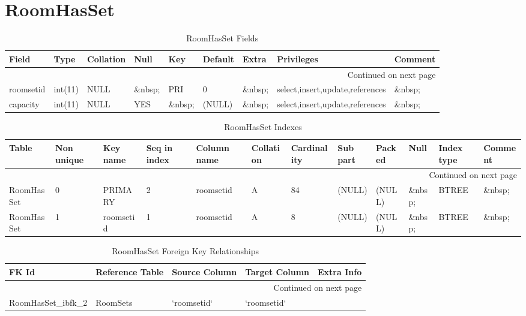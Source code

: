 \documentclass[tablesignature,landscape]{scrartcl}
\begin{document}
\section{RoomHasSet}
\label{sec-21}


\begin{longtable}{|l|l|l|l|l|l|l|l|l|}
\caption{RoomHasSet Fields} \label{tbl:roomhassetfields}\\
\hline
 Field      &  Type     &  Collation  &  Null     &  Key      &  Default  &  Extra    &  Privileges                       &  Comment \\
\hline
\endhead
\hline\multicolumn{9}{r}{Continued on next page}\
\endfoot
\endlastfoot
\hline
 roomid     &  int(11)  &  NULL       &  \&nbsp;  &  PRI      &        0  &  \&nbsp;  &  select,insert,update,references  &  \&nbsp;  \\
 roomsetid  &  int(11)  &  NULL       &  \&nbsp;  &  PRI      &        0  &  \&nbsp;  &  select,insert,update,references  &  \&nbsp;  \\
 capacity   &  int(11)  &  NULL       &  YES      &  \&nbsp;  &   (NULL)  &  \&nbsp;  &  select,insert,update,references  &  \&nbsp;  \\
\hline
\end{longtable}


\begin{longtable}{|l|l|l|l|l|l|l|l|l|l|l|l|}
\caption{RoomHasSet Indexes} \label{tbl:roomhassetindexes}\\
\hline
 Table       &  Non unique  &  Key name   &  Seq in index  &  Column name  &  Collation  &  Cardinality  &  Sub part  &  Packed  &  Null     &  Index type  &  Comment \\
\hline
\endhead
\hline\multicolumn{12}{r}{Continued on next page}\
\endfoot
\endlastfoot
\hline
 RoomHasSet  &           0  &  PRIMARY    &             1  &  roomid       &  A          &           84  &  (NULL)    &  (NULL)  &  \&nbsp;  &  BTREE       &  \&nbsp;  \\
 RoomHasSet  &           0  &  PRIMARY    &             2  &  roomsetid    &  A          &           84  &  (NULL)    &  (NULL)  &  \&nbsp;  &  BTREE       &  \&nbsp;  \\
 RoomHasSet  &           1  &  roomsetid  &             1  &  roomsetid    &  A          &            8  &  (NULL)    &  (NULL)  &  \&nbsp;  &  BTREE       &  \&nbsp;  \\
\hline
\end{longtable}


\begin{longtable}{|l|l|l|l|l|}
\caption{RoomHasSet Foreign Key Relationships} \label{tbl:roomhassetfkr}\\
\hline
 FK Id                    &  Reference Table  &  Source Column  &  Target Column  &  Extra Info \\
\hline
\endhead
\hline\multicolumn{5}{r}{Continued on next page}\
\endfoot
\endlastfoot
\hline
 RoomHasSet\_{}ibfk\_{}1  &  Rooms            &  `roomid`       &  `roomid`       &              \\
 RoomHasSet\_{}ibfk\_{}2  &  RoomSets         &  `roomsetid`    &  `roomsetid`    &              \\
\hline
\end{longtable}
\end{document}
